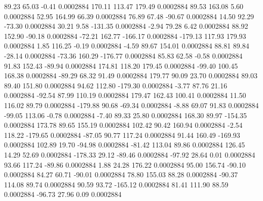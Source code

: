        89.23       65.03       -0.41     0.0002884
      170.11      113.47      179.49     0.0002884
       89.53      163.08        5.60     0.0002884
       52.95      164.99       66.39     0.0002884
       76.89       67.48      -90.67     0.0002884
       14.50       92.29      -73.30     0.0002884
       30.21        9.58     -131.35     0.0002884
       -2.94       79.28        6.42     0.0002884
       88.92      152.90      -90.18     0.0002884
      -72.21      162.77     -166.17     0.0002884
     -179.13      117.93      179.93     0.0002884
        1.85      116.25       -0.19     0.0002884
       -4.59       89.67      154.01     0.0002884
       88.81       89.84      -28.14     0.0002884
      -73.36      160.29     -176.77     0.0002884
       85.83       62.58       -0.58     0.0002884
       91.83      152.43      -89.94     0.0002884
      174.81      118.20      179.45     0.0002884
      -99.40      100.45      168.38     0.0002884
      -89.29       68.32       91.49     0.0002884
      179.77       90.09       23.70     0.0002884
       89.03       89.40      151.80     0.0002884
       94.62      112.80     -179.30     0.0002884
       -3.77       87.76       21.16     0.0002884
      -92.54       87.99      110.19     0.0002884
      179.47      162.43      100.41     0.0002884
       11.50      116.02       89.79     0.0002884
     -179.88       90.68      -69.34     0.0002884
       -8.88       69.07       91.83     0.0002884
      -99.05      113.06       -0.78     0.0002884
       -7.40       89.33       25.80     0.0002884
      168.30       89.97     -154.35     0.0002884
      173.78       89.65      155.19     0.0002884
      102.42       90.42      160.94     0.0002884
       -2.54      118.22     -179.65     0.0002884
      -87.05       90.77      117.24     0.0002884
       91.44      160.49     -169.93     0.0002884
      102.89       19.70      -94.98     0.0002884
      -81.42      113.04       89.86     0.0002884
      126.45       14.29       52.69     0.0002884
     -178.33       29.12      -89.46     0.0002884
      -97.92       28.64        0.01     0.0002884
       93.66      117.24      -89.86     0.0002884
        1.88       24.28      176.22     0.0002884
       95.00      156.74      -90.10     0.0002884
       84.27       60.71      -90.01     0.0002884
       78.80      155.03       88.28     0.0002884
      -90.37      114.08       89.74     0.0002884
       90.59       93.72     -165.12     0.0002884
       81.41      111.90       88.59     0.0002884
      -96.73       27.96        0.09     0.0002884
